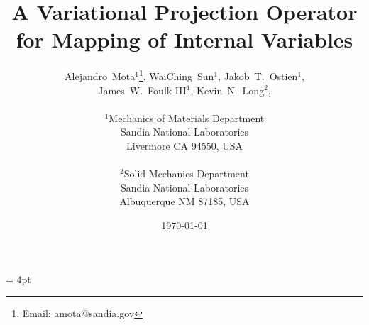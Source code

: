 \documentclass[12pt]{article}
\begin{document}
\setlength{\headheight}{15pt}
\headsep = 4pt
\pagestyle{fancyplain}


\rfoot
[\fancyplain{}{\bf{\today}}]
{\fancyplain{}{\bf{\today}}}



\title{A Variational Projection Operator for Mapping of Internal
Variables}

\author{
  \Large
  Alejandro~Mota$^1$\thanks{Email: amota@sandia.gov},
  WaiChing~Sun$^1$,
  Jakob~T.~Ostien$^1$,
  \\
  \Large
  James~W.~Foulk {III}$^1$,
  Kevin~N.~Long$^2$,
  \\
  \\
  $^1$Mechanics of Materials Department\\
  Sandia National Laboratories\\
  Livermore CA 94550, USA\\
  \\
  $^2$Solid Mechanics Department\\
  Sandia National Laboratories\\
  Albuquerque NM 87185, USA\\
}

\date{\today}

\maketitle
\end{document}
